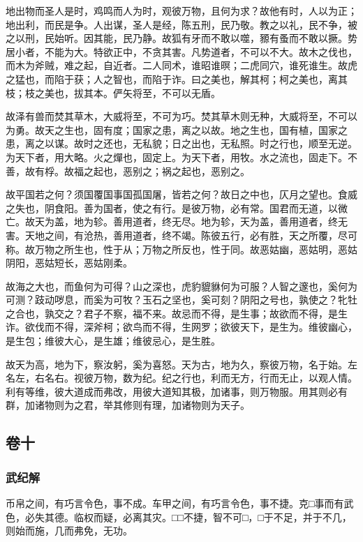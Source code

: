 \documentclass[]{article}
\begin{document}
地出物而圣人是时，鸡鸣而人为时，观彼万物，且何为求？故他有时，人以为正；地出利，而民是争。人出谋，圣人是经，陈五刑，民乃敬。教之以礼，民不争，被之以刑，民始听。因其能，民乃静。故狐有牙而不敢以噬，豲有蚤而不敢以撅。势居小者，不能为大。特欲正中，不贪其害。凡势道者，不可以不大。故木之伐也，而木为斧贼，难之起，自近者。二人同术，谁昭谁暝；二虎同穴，谁死谁生。故虎之猛也，而陷于获；人之智也，而陷于诈。曰之美也，解其柯；柯之美也，离其枝；枝之美也，拔其本。俨矢将至，不可以无盾。

故泽有兽而焚其草木，大威将至，不可为巧。焚其草木则无种，大威将至，不可以为勇。故天之生也，固有度；国家之患，离之以故。地之生也，国有植，国家之患，离之以谋。故时之还也，无私貌；日之出也，无私照。时之行也，顺至无逆。为天下者，用大略。火之燀也，固定上。为天下者，用牧。水之流也，固走下。不善，故有桴。故福之起也，恶别之；祸之起也，恶别之。

故平国若之何？须国覆国事国孤国屠，皆若之何？故日之中也，仄月之望也。食威之失也，阴食阳。善为国者，使之有行。是彼万物，必有常。国君而无道，以微亡。故天为盖，地为轸。善用道者，终无尽。地为轸，天为盖，善用道者，终无害。天地之间，有沧热，善用道者，终不竭。陈彼五行，必有胜，天之所覆，尽可称。故万物之所生也，性于从；万物之所反也，性于同。故恶姑幽，恶姑明，恶姑阴阳，恶姑短长，恶姑刚柔。

故海之大也，而鱼何为可得？山之深也，虎豹貔貅何为可服？人智之邃也，奚何为可测？跂动哕息，而奚为可牧？玉石之坚也，奚可刻？阴阳之号也，孰使之？牝牡之合也，孰交之？君子不察，福不来。故忌而不得，是生事；故欲而不得，是生诈。欲伐而不得，深斧柯；欲鸟而不得，生网罗；欲彼天下，是生为。维彼幽心，是生包；维彼大心，是生雄；维彼忌心，是生胜。

故天为高，地为下，察汝躬，奚为喜怒。天为古，地为久，察彼万物，名于始。左名左，右名右。视彼万物，数为纪。纪之行也，利而无方，行而无止，以观人情。利有等维，彼大道成而弗改，用彼大道知其极，加诸事，则万物服。用其则必有群，加诸物则为之君，举其修则有理，加诸物则为天子。

\hypertarget{header-n371}{%
\subsection{卷十}\label{header-n371}}

\hypertarget{header-n375}{%
\subsubsection{武纪解}\label{header-n375}}

币帛之间，有巧言令色，事不成。车甲之间，有巧言令色，事不捷。克□事而有武色，必失其德。临权而疑，必离其灾。□□不捷，智不可□，□于不足，并于不几，则始而施，几而弗免，无功。
\end{document}
